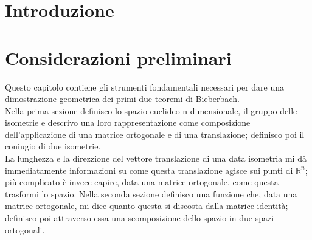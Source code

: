 \documentclass[10pt,a4paper]{article}
\author{Elisa Caruso}
\begin{document}
 

\section*{Introduzione}




\section{Considerazioni preliminari}
Questo capitolo contiene gli strumenti fondamentali necessari per dare una dimostrazione geometrica dei primi due teoremi di Bieberbach. \\
Nella prima sezione definisco lo spazio euclideo n-dimensionale, il gruppo delle isometrie e descrivo una loro rappresentazione come composizione dell'applicazione di una matrice ortogonale e di una translazione; definisco poi il coniugio di due isometrie. \\
La lunghezza e la direzzione del vettore translazione di una data isometria mi dà immediatamente informazioni su come questa translazione agisce sui punti di $\mathbb{R}^n$; più complicato è invece capire, data una matrice ortogonale, come questa trasformi lo spazio. Nella seconda sezione definisco una funzione che, data una matrice ortogonale, mi dice quanto questa si discosta dalla matrice identità; definisco poi attraverso essa una scomposizione dello spazio in due spazi ortogonali. 
\end{document}
